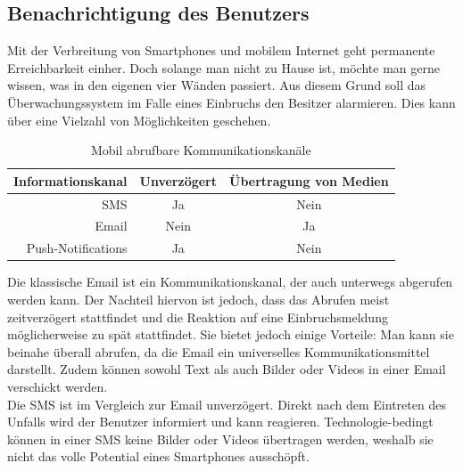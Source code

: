 \subsection{Benachrichtigung des Benutzers}\label{ss:benachrichtigung}

Mit der Verbreitung von Smartphones und mobilem Internet geht permanente Erreichbarkeit einher. Doch solange man nicht zu Hause ist, möchte man gerne wissen, was in den eigenen vier Wänden passiert. Aus diesem Grund soll das Überwachungssystem im Falle eines Einbruchs den Besitzer alarmieren. Dies kann über eine Vielzahl von Möglichkeiten geschehen. 

\vspace{5 mm}
\begin{table}[H] 
	\centering
	\begin{tabular}{|r||c|c|}\hline
		Informationskanal & Unverzögert & Übertragung von Medien\\ \hline \hline
		SMS & Ja & Nein \\ \hline
		Email & Nein & Ja \\ \hline
		Push-Notifications & Ja & Nein \\ \hline
	\end{tabular}
	\caption{Mobil abrufbare Kommunikationskanäle}
	\label{t:benachrichtugung}
\end{table}

Die klassische Email ist ein Kommunikationskanal, der auch unterwegs abgerufen werden kann. Der Nachteil hiervon ist jedoch, dass das Abrufen meist zeitverzögert stattfindet und die Reaktion auf eine Einbruchsmeldung möglicherweise zu spät stattfindet. Sie bietet jedoch einige Vorteile: Man kann sie beinahe überall abrufen, da die Email ein universelles Kommunikationsmittel darstellt. Zudem können sowohl Text als auch Bilder oder Videos in einer Email verschickt werden.\\

Die SMS ist im Vergleich zur Email unverzögert.  Direkt nach dem Eintreten des Unfalls wird der Benutzer informiert und kann reagieren. Technologie-bedingt können in einer SMS keine Bilder oder Videos übertragen werden, weshalb sie nicht das volle Potential eines Smartphones ausschöpft.\\


